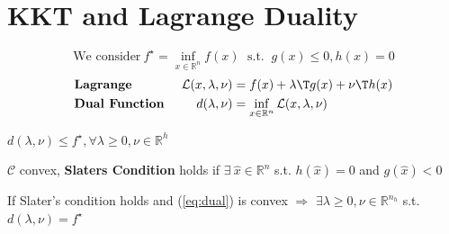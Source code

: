 \section{KKT and Lagrange Duality}

%
\vspace{-4mm}
\begin{equation}
	\text{We consider}\
	f^\star = \inf_{x\in\mathcal{\mathbb{R}}^n}f(x)
	\;\text{ s.t. }\ g(x)\le0,h(x)=0
	\label{eq:dual}
\end{equation}
\vspace{-3mm}
$$\begin{aligned}
		                           & \textbf{Lagrange }                                              &
		\mathcal{L}(x,\lambda,\nu) & = f(x) + \lambda\T g(x)+\nu\T h(x)
		\\
		                           & \textbf{Dual Function }                                         &
		d(\lambda,\nu)             & = \inf_{x \in \mathcal{\mathbb{R}}^n}\mathcal{L}(x,\lambda,\nu)
	\end{aligned}$$
\vspace{-2mm}
\begin{proposition}
	$d(\lambda,\nu)\le f^\star,\forall\lambda\ge0,\nu\in\mathbb{R}^{h}$
\end{proposition}

\begin{definition}
	$\mathcal{C}$ convex, \textbf{Slaters Condition} holds if
	$\exists\ \hat{x} \in \mathbb{R}^{n}$ s.t. $h(\hat{x})=0$ and $g(\hat{x})<0$
\end{definition}

\begin{proposition}
	If Slater's condition holds
	and (\ref{eq:dual}) is convex
	$\Rightarrow$
	$\exists \lambda \ge 0, \nu \in \mathbb{R}^{n_h}$ s.t. $d(\lambda,\nu)=f^\star$
\end{proposition}

